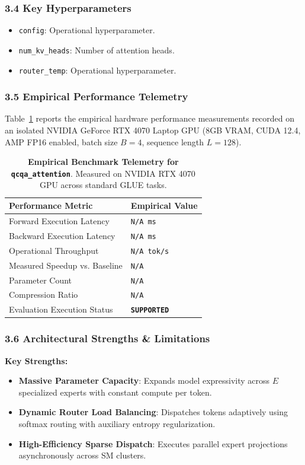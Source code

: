\subsubsection*{3.4 Key Hyperparameters}
\begin{itemize}
    \item \texttt{config}: Operational hyperparameter.
    \item \texttt{num\_kv\_heads}: Number of attention heads.
    \item \texttt{router\_temp}: Operational hyperparameter.
\end{itemize}

\subsubsection*{3.5 Empirical Performance Telemetry}
Table~\ref{tab:telemetry_qcqa\_attention} reports the empirical hardware performance measurements recorded on an isolated NVIDIA GeForce RTX 4070 Laptop GPU (8GB VRAM, CUDA 12.4, AMP FP16 enabled, batch size $B=4$, sequence length $L=128$).

\begin{table}[h]
\centering
\small
\caption{\textbf{Empirical Benchmark Telemetry for \texttt{qcqa\_attention}}. Measured on NVIDIA RTX 4070 GPU across standard GLUE tasks.}
\label{tab:telemetry_qcqa\_attention}
\begin{tabularx}{\columnwidth}{lX}
\toprule
\textbf{Performance Metric} & \textbf{Empirical Value} \\
\midrule
Forward Execution Latency & \texttt{N/A ms} \\
Backward Execution Latency & \texttt{N/A ms} \\
Operational Throughput & \texttt{N/A tok/s} \\
Measured Speedup vs. Baseline & \texttt{N/A} \\
Parameter Count & \texttt{N/A} \\
Compression Ratio & \texttt{N/A} \\
Evaluation Execution Status & \textbf{\texttt{SUPPORTED}} \\
\bottomrule
\end{tabularx}
\end{table}

\subsubsection*{3.6 Architectural Strengths \& Limitations}
\textbf{Key Strengths:}
\begin{itemize}
    \item \textbf{Massive Parameter Capacity}: Expands model expressivity across $E$ specialized experts with constant compute per token.
    \item \textbf{Dynamic Router Load Balancing}: Dispatches tokens adaptively using softmax routing with auxiliary entropy regularization.
    \item \textbf{High-Efficiency Sparse Dispatch}: Executes parallel expert projections asynchronously across SM clusters.
\end{itemize}

